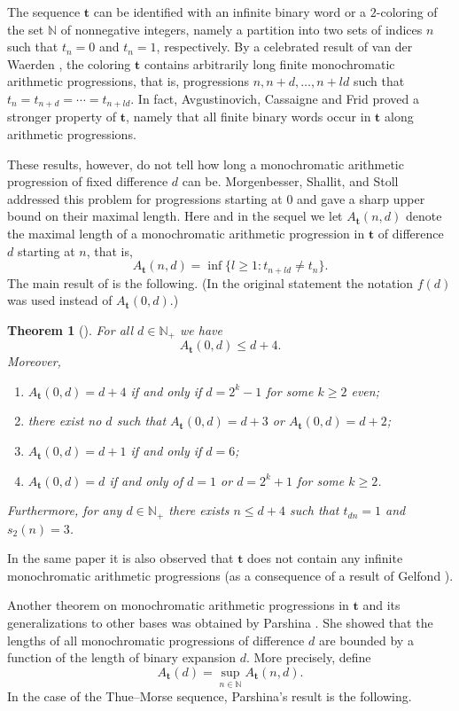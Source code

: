 \documentclass[a4paper,11pt]{amsart}
\newtheorem{thm}{Theorem}[section]
\theoremstyle{definition}
\newcommand{\N}{\mathbb{N}}
\begin{document}
The sequence $\mathbf{t}$ can be identified with an infinite binary word or a $2$-coloring of the set $\N$ of nonnegative integers, namely a partition into two sets of indices $n$ such that $t_n=0$ and $t_n =1$, respectively. By a celebrated result of van der Waerden \cite{vdW27}, the coloring $\mathbf{t}$ contains arbitrarily long finite monochromatic arithmetic progressions, that is, progressions $n,n+d,\ldots,n+ld $ such that $t_n = t_{n+d} =  \cdots = t_{n+ld}$.
In fact, Avgustinovich, Cassaigne and Frid \cite{ACF06} proved a stronger property of $\mathbf{t}$, namely that all finite binary words occur in $\mathbf{t}$ along arithmetic progressions.

These results, however, do not tell how long a monochromatic arithmetic progression of fixed difference $d$ can be. Morgenbesser, Shallit, and Stoll \cite{MSS11} addressed this problem for progressions starting at $0$ and gave a sharp upper bound on their maximal length. Here and in the sequel we let $A_{\mathbf{t}}(n,d)$ denote the maximal length of a monochromatic arithmetic progression in $\mathbf{t}$ of difference $d$ starting at $n$, that is,
$$ A_{\mathbf{t}}(n,d) = \inf\{l \geq 1: t_{n+ld} \neq t_n \}.    $$
The main result of \cite{MSS11} is the following. (In the original statement the notation $f(d)$ was used instead of $A_{\mathbf{t}}(0,d)$.)

\begin{thm}[\cite{MSS11}] \label{thm:MSS11}
For all $d \in \N_{+}$ we have
$$A_{\mathbf{t}}(0,d) \leq d+4.$$
Moreover,
\begin{enumerate}[label={\textup{(\roman*)}}]
\item $A_{\mathbf{t}}(0,d) = d+4$ if and only if $d = 2^{k}-1$ for some $k \geq 2$ even;
\item there exist no $d$ such that $A_{\mathbf{t}}(0,d)=d+3$ or $A_{\mathbf{t}}(0,d) = d+2$;
\item $A_{\mathbf{t}}(0,d) = d+1$ if and only if $d=6$;
\item $A_{\mathbf{t}}(0,d) = d$ if and only of $d=1$ or $d=2^k+1$ for some $k \geq 2$.
\end{enumerate}
Furthermore, for any $d \in \N_{+}$ there exists $n \leq d+4$ such that $t_{dn}=1$ and $s_2(n)=3$.
\end{thm}
In the same paper it is also observed that $\mathbf{t}$ does not contain any infinite monochromatic arithmetic progressions (as a consequence of a result of Gelfond \cite{Gel67}).

Another theorem on monochromatic arithmetic progressions in $\mathbf{t}$ and its generalizations to other bases was obtained by Parshina \cite{Par17}. She showed that the lengths of all monochromatic progressions of difference $d$ are bounded by a function of the length of binary expansion $d$. More precisely, define
$$ A_{\mathbf{t}}(d) = \sup_{n \in \N} A_{\mathbf{t}}(n,d).   $$
In the case of the Thue--Morse sequence, Parshina's result is the following.
\end{document}
